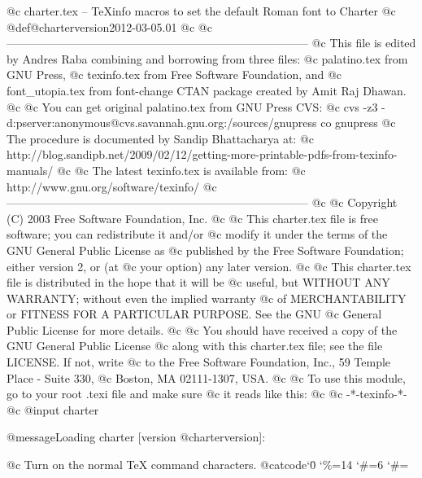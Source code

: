 @c charter.tex -- TeXinfo macros to set the default Roman font to Charter
@c
@def@charterversion{2012-03-05.01}
@c
@c--------------------------------------------------------------------------------
@c This file is edited by Andres Raba combining and borrowing from three files: 
@c palatino.tex from GNU Press,
@c texinfo.tex from Free Software Foundation, and
@c font_utopia.tex from font-change CTAN package created by Amit Raj Dhawan.
@c 
@c You can get original palatino.tex from GNU Press CVS:
@c cvs -z3 -d:pserver:anonymous@cvs.savannah.gnu.org:/sources/gnupress co gnupress
@c The procedure is documented by Sandip Bhattacharya at:
@c http://blog.sandipb.net/2009/02/12/getting-more-printable-pdfs-from-texinfo-manuals/
@c
@c The latest texinfo.tex is available from:
@c http://www.gnu.org/software/texinfo/
@c--------------------------------------------------------------------------------
@c
@c Copyright (C) 2003  Free Software Foundation, Inc.
@c
@c This charter.tex file is free software; you can redistribute it and/or
@c modify it under the terms of the GNU General Public License as
@c published by the Free Software Foundation; either version 2, or (at
@c your option) any later version.
@c
@c This charter.tex file is distributed in the hope that it will be
@c useful, but WITHOUT ANY WARRANTY; without even the implied warranty
@c of MERCHANTABILITY or FITNESS FOR A PARTICULAR PURPOSE.  See the GNU
@c General Public License for more details.
@c
@c You should have received a copy of the GNU General Public License
@c along with this charter.tex file; see the file LICENSE.  If not, write
@c to the Free Software Foundation, Inc., 59 Temple Place - Suite 330,
@c Boston, MA 02111-1307, USA.
@c
@c To use this module, go to your root .texi file and make sure
@c it reads like this:
@c       @c -*-texinfo-*-
@c     @input charter

@message{Loading charter [version @charterversion]:}

@c Turn on the normal TeX command characters.
@catcode`\=0
\catcode`\%=14
\catcode`\#=6
\let\setfontorig=\setfont
\def\setfont#1#2#3#4{\font#1=#2#3 at #4}
\catcode`\#=\other

\def\rmfontprefix{mdbch}

\def\rmshape{r7t}
\def\rmbshape{b7t}
\def\bfshape{b7t}
\def\bxshape{b7t}
\def\itshape{ri7t}
\def\itbshape{bi7t}
\def\slshape{ro7t}
\def\slbshape{bo7t}
\def\scshape{rfc8t}
\def\scbshape{bfc8t}

